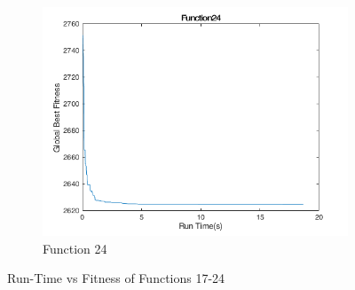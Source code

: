 \begin{figure}
\begin{subfigure}[b]{0.4\textwidth}
    \includegraphics[width=\textwidth]{img/cecrt/f24}
    \caption{Function 24}
  \end{subfigure}
  \caption{Run-Time vs Fitness of Functions 17-24}
\end{figure}

\clearpage

